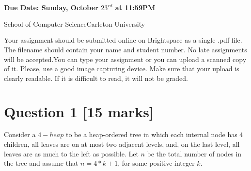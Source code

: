 \documentclass[11pt]{article}
\date{}
\begin{document}
\begin{center}
\\
\vspace{0.5cm}
\\
\vspace{0.5cm}
{\bf Due Date: Sunday, October $23^{rd}$ at 11:59PM}
\end{center}
\noindent School of Computer Science\hfill{Carleton University}

\noindent \hrulefill

Your assignment should be submitted online on Brightspace as a single .pdf file.  The filename should contain your name and student number. No late assignments will be accepted.You can type your assignment or you can upload a scanned copy of it.  Please, use a good image capturing device. Make sure that your upload is clearly readable. If it is difficult to read, it will not be graded.

\section*{Question 1 [15 marks]}
Consider a $4-heap$ to be a heap-ordered tree in which each internal node has 4 children, all leaves are on at most two adjacent levels, and, on the last level, all
leaves are as much to the left as possible. Let $n$ be the total number of nodes in the tree and  assume that $n=4*k + 1 $, for some positive integer $k$.
\end{document}
